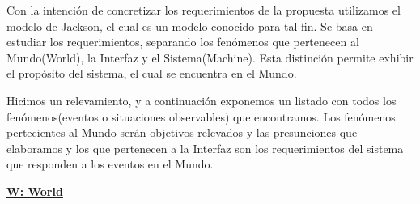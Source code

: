 Con la intención de concretizar los requerimientos de la propuesta utilizamos el modelo de Jackson, el cual es un modelo conocido para tal fin.
Se basa en estudiar los requerimientos, separando los fenómenos que pertenecen al Mundo(World), la Interfaz y el Sistema(Machine). Esta distinción permite exhibir el propósito del sistema, el cual se encuentra en el Mundo. 

Hicimos un relevamiento, y a continuación exponemos un listado con todos los fenómenos(eventos o situaciones observables) que encontramos.
Los fenómenos pertecientes al Mundo serán objetivos relevados y las presunciones que elaboramos y los que pertenecen a la Interfaz son los requerimientos del sistema que responden a los eventos en el Mundo.


\vspace{1cm}
\textbf{\underline{W: World}}


